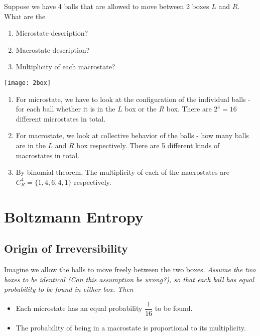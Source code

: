 \documentclass[class=article, crop=false, 12pt]{standalone}
\begin{document}
\begin{example}
    Suppose we have 4 balls that are allowed to move between 2 boxes $L$ and $R$. What are the 
    \begin{enumerate}
        \item Microstate description?
        \item Macrostate description?
        \item Multiplicity of each macrostate?
    \end{enumerate}

    \begin{center}
        \begin{minipage}{0.95\linewidth}
            \centering
            \texttt{[image: 2box]}
        \end{minipage}
    \end{center}

    \begin{enumerate}
        \item For microstate, 
        we have to look at the configuration of the individual balls - 
        for each ball whether it is in the $L$ box or the $R$ box. 
        There are $2^4=16$ different microstates in total.

        \item For macrostate, we look at collective behavior of the balls - 
        how many balls are in the $L$ and $R$ box respectively. 
        There are 5 different kinds of macrostates in total.

        \item By binomial theorem, 
        The multiplicity of each of the macrostates are $C^4_R = \{1,4,6,4,1\}$ respectively. 

    \end{enumerate}
\end{example}



\linesep
\newpage
\section{Boltzmann Entropy}

\subsection{Origin of Irreversibility}

Imagine we allow the balls to move freely between the two boxes. 
\it{Assume} the two boxes to be identical (Can this assumption be wrong?), 
so that each ball has equal probability to be found in either box. 
Then
\begin{itemize}
    \item Each microstate has an equal probability $\dfrac{1}{16}$ to be found.
    \item The probability of being in a macrostate is proportional to its multiplicity. 
    
\end{itemize}
\end{document}
